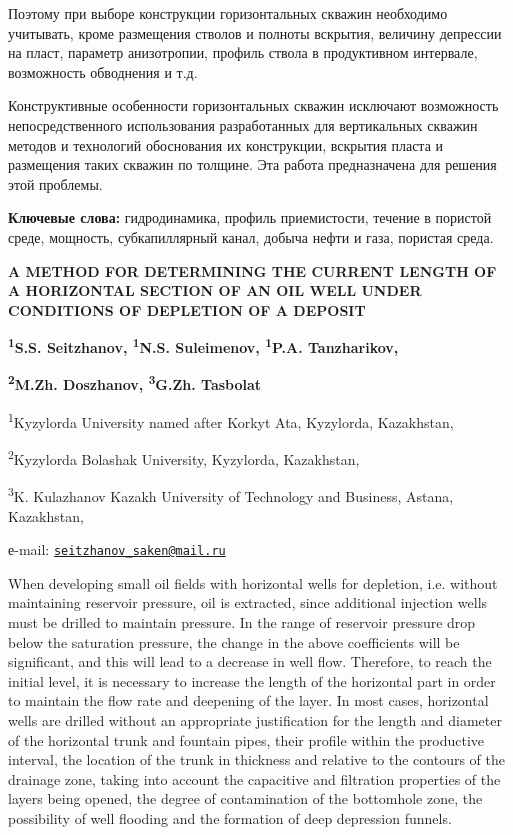 Поэтому при выборе конструкции горизонтальных скважин необходимо
учитывать, кроме размещения стволов и полноты вскрытия, величину
депрессии на пласт, параметр анизотропии, профиль ствола в продуктивном
интервале, возможность обводнения и т.д.

Конструктивные особенности горизонтальных скважин исключают возможность
непосредственного использования разработанных для вертикальных скважин
методов и технологий обоснования их конструкции, вскрытия пласта и
размещения таких скважин по толщине. Эта работа предназначена для
решения этой проблемы.

{\bfseries Ключевые слова:} гидродинамика, профиль приемистости, течение в
пористой среде, мощность, субкапиллярный канал, добыча нефти и газа,
пористая среда.
\begin{articleheader}

{\bfseries A METHOD FOR DETERMINING THE CURRENT LENGTH OF A HORIZONTAL
SECTION OF AN OIL WELL UNDER CONDITIONS OF DEPLETION OF A DEPOSIT}

{\bfseries \textsuperscript{1}S.S. Seitzhanov\textsuperscript{\envelope},
\textsuperscript{1}N.S. Suleimenov, \textsuperscript{1}P.A. Tanzharikov,}

{\bfseries \textsuperscript{2}M.Zh. Doszhanov, \textsuperscript{3}G.Zh. Tasbolat}
\end{articleheader}
\begin{affiliation}

\textsuperscript{1}Kyzylorda University named after Korkyt Ata,
Kyzylorda, Kazakhstan,

\textsuperscript{2}Kyzylorda Bolashak University, Kyzylorda, Kazakhstan,

\textsuperscript{3}K. Kulazhanov Kazakh University of Technology and
Business, Astana, Kazakhstan,

е-mail:
\href{mailto:seitzhanov_saken@mail.ru}{\nolinkurl{seitzhanov\_saken@mail.ru}}
\end{affiliation}

When developing small oil fields with horizontal wells for depletion,
i.e. without maintaining reservoir pressure, oil is extracted, since
additional injection wells must be drilled to maintain pressure. In the
range of reservoir pressure drop below the saturation pressure, the
change in the above coefficients will be significant, and this will lead
to a decrease in well flow. Therefore, to reach the initial level, it is
necessary to increase the length of the horizontal part in order to
maintain the flow rate and deepening of the layer. In most cases,
horizontal wells are drilled without an appropriate justification for
the length and diameter of the horizontal trunk and fountain pipes,
their profile within the productive interval, the location of the trunk
in thickness and relative to the contours of the drainage zone, taking
into account the capacitive and filtration properties of the layers
being opened, the degree of contamination of the bottomhole zone, the
possibility of well flooding and the formation of deep depression
funnels.


